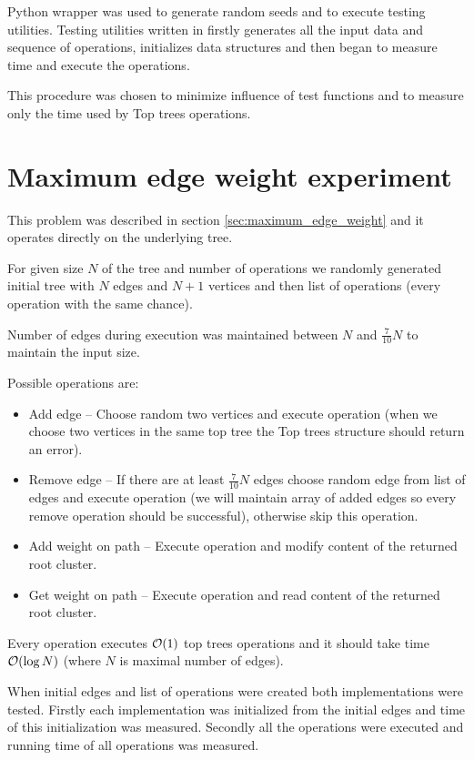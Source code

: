 Python wrapper was used to generate random seeds and to execute testing utilities.
Testing utilities written in \Cpp{} firstly generates all the input data and
sequence of operations, initializes data structures and then began to measure
time and execute the operations.

This procedure was chosen to minimize influence of test functions and to measure
only the time used by Top trees operations.

\vfill\eject %

\section{Maximum edge weight experiment}
\label{sec:experiment_maximum_edge_weight}

This problem was described in section \ref{sec:maximum_edge_weight} and it
operates directly on the underlying tree.

For given size $N$ of the tree and number of operations we randomly generated
initial tree with $N$ edges and $N+1$ vertices and then list of operations
(every operation with the same chance).

Number of edges during execution was maintained between $N$ and $\frac{7}{10}N$
to maintain the input size.

Possible operations are:

\begin{itemize}
\item Add edge -- Choose random two vertices and execute \Link{} operation
(when we choose two vertices in the same top tree the Top trees structure should
return an error).
\item Remove edge -- If there are at least $\frac{7}{10}N$ edges choose random
edge from list of edges and execute \Cut{} operation (we will maintain array of
added edges so every remove operation should be successful), otherwise skip this
operation.
\item Add weight on path -- Execute \Expose{} operation and modify content of
the returned root cluster.
\item Get weight on path -- Execute \Expose{} operation and read content of the
returned root cluster.
\end{itemize}

Every operation executes ${\cal O}(1)$ top trees operations and it should take time
${\cal O}(\log N)$ (where $N$ is maximal number of edges).

When initial edges and list of operations were created both implementations were
tested. Firstly each implementation was initialized from the initial edges and
time of this initialization was measured. Secondly all the operations were
executed and running time of all operations was measured.

